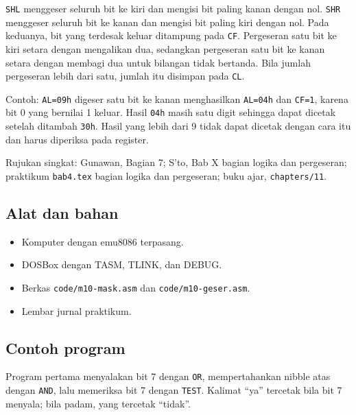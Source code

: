 \texttt{SHL} menggeser seluruh bit ke kiri dan mengisi bit paling
kanan dengan nol. \texttt{SHR} menggeser seluruh bit ke kanan dan
mengisi bit paling kiri dengan nol. Pada keduanya, bit yang terdesak
keluar ditampung pada \texttt{CF}. Pergeseran satu bit ke kiri setara
dengan mengalikan dua, sedangkan pergeseran satu bit ke kanan setara
dengan membagi dua untuk bilangan tidak bertanda. Bila jumlah
pergeseran lebih dari satu, jumlah itu disimpan pada \texttt{CL}.

Contoh: \texttt{AL=09h} digeser satu bit ke kanan menghasilkan
\texttt{AL=04h} dan \texttt{CF=1}, karena bit 0 yang bernilai 1
keluar. Hasil \texttt{04h} masih satu digit sehingga dapat dicetak
setelah ditambah \texttt{30h}. Hasil yang lebih dari 9 tidak dapat
dicetak dengan cara itu dan harus diperiksa pada register.

\begin{rujukan}
Rujukan singkat: Gunawan, Bagian 7; S'to, Bab X bagian logika dan
pergeseran; praktikum \texttt{bab4.tex} bagian logika dan
pergeseran; buku ajar, \texttt{chapters/11}.
\end{rujukan}

\subsection{Alat dan bahan}

\begin{itemize}
    \item Komputer dengan emu8086 terpasang.
    \item DOSBox dengan TASM, TLINK, dan DEBUG.
    \item Berkas \texttt{code/m10-mask.asm} dan
          \texttt{code/m10-geser.asm}.
    \item Lembar jurnal praktikum.
\end{itemize}

\subsection{Contoh program}

Program pertama menyalakan bit 7 dengan \texttt{OR}, mempertahankan
nibble atas dengan \texttt{AND}, lalu memeriksa bit 7 dengan
\texttt{TEST}. Kalimat ``ya'' tercetak bila bit 7 menyala; bila
padam, yang tercetak ``tidak''.



